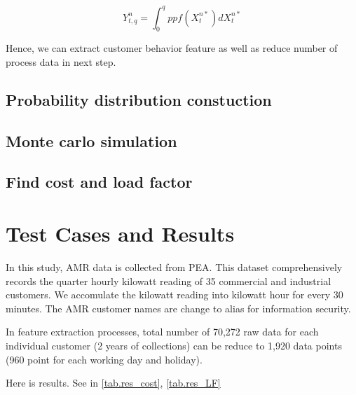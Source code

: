 \documentclass[conference]{IEEEtran}
\begin{document}
\begin{equation}
  Y_{t,q}^{n}=\int_{0}^{q} ppf(X_{t}^{n*}) dX_{t}^{n*}
  \label{eq.quantile_formular}
\end{equation}

Hence, we can extract customer behavior feature as well as reduce number of process data in next step.

\subsection{Probability distribution constuction}

\subsection{Monte carlo simulation}


\subsection{Find cost and load factor}

\section{Test Cases and Results}
In this study, AMR data is collected from PEA. This dataset comprehensively records the quarter hourly kilowatt reading of 35 commercial and industrial customers. We accomulate the kilowatt reading into kilowatt hour for every 30 minutes. The AMR customer names are change to alias for information security.


In feature extraction processes, total number of 70,272 raw data for each individual customer (2 years of collections) can be reduce to 1,920 data points (960 point for each working day and holiday).

Here is results. See in \ref{tab.res_cost}, \ref{tab.res_LF}
\end{document}

